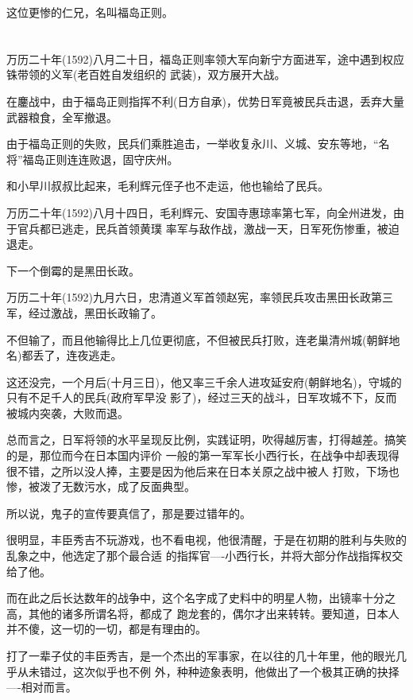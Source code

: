 \documentclass[11pt,a4paper,onecolumn]{article}
\begin{document}
这位更惨的仁兄，名叫福岛正则。

\section[\thesection]{}

万历二十年(1592)八月二十日，福岛正则率领大军向新宁方面进军，途中遇到权应铢带领的义军(老百姓自发组织的
武装)，双方展开大战。

在鏖战中，由于福岛正则指挥不利(日方自承)，优势日军竟被民兵击退，丢弃大量武器粮食，全军撤退。

由于福岛正则的失败，民兵们乘胜追击，一举收复永川、义城、安东等地，``名将''福岛正则连连败退，固守庆州。

和小早川叔叔比起来，毛利辉元侄子也不走运，他也输给了民兵。

万历二十年(1592)八月十四日，毛利辉元、安国寺惠琼率第七军，向全州进发，由于官兵都已逃走，民兵首领黄璞
率军与敌作战，激战一天，日军死伤惨重，被迫退走。

下一个倒霉的是黑田长政。

万历二十年(1592)九月六日，忠清道义军首领赵宪，率领民兵攻击黑田长政第三军，经过激战，黑田长政输了。

不但输了，而且他输得比上几位更彻底，不但被民兵打败，连老巢清州城(朝鲜地名)都丢了，连夜逃走。

这还没完，一个月后(十月三日)，他又率三千余人进攻延安府(朝鲜地名)，守城的只有不足千人的民兵(政府军早没
影了)，经过三天的战斗，日军攻城不下，反而被城内突袭，大败而退。

总而言之，日军将领的水平呈现反比例，实践证明，吹得越厉害，打得越差。搞笑的是，那位而今在日本国内评价
一般的第一军军长小西行长，在战争中却表现得很不错，之所以没人捧，主要是因为他后来在日本关原之战中被人
打败，下场也惨，被泼了无数污水，成了反面典型。

所以说，鬼子的宣传要真信了，那是要过错年的。

很明显，丰臣秀吉不玩游戏，也不看电视，他很清醒，于是在初期的胜利与失败的乱象之中，他选定了那个最合适
的指挥官----小西行长，并将大部分作战指挥权交给了他。

而在此之后长达数年的战争中，这个名字成了史料中的明星人物，出镜率十分之高，其他的诸多所谓名将，都成了
跑龙套的，偶尔才出来转转。要知道，日本人并不傻，这一切的一切，都是有理由的。

打了一辈子仗的丰臣秀吉，是一个杰出的军事家，在以往的几十年里，他的眼光几乎从未错过，这次似乎也不例
外，种种迹象表明，他做出了一个极其正确的抉择----相对而言。

\section[\thesection]{}
\end{document}
